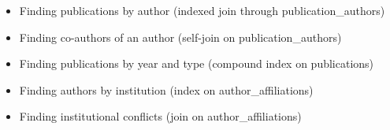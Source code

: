 \begin{itemize}
    \item Finding publications by author (indexed join through publication\_authors)
    \item Finding co-authors of an author (self-join on publication\_authors)
    \item Finding publications by year and type (compound index on publications)
    \item Finding authors by institution (index on author\_affiliations)
    \item Finding institutional conflicts (join on author\_affiliations)
\end{itemize}